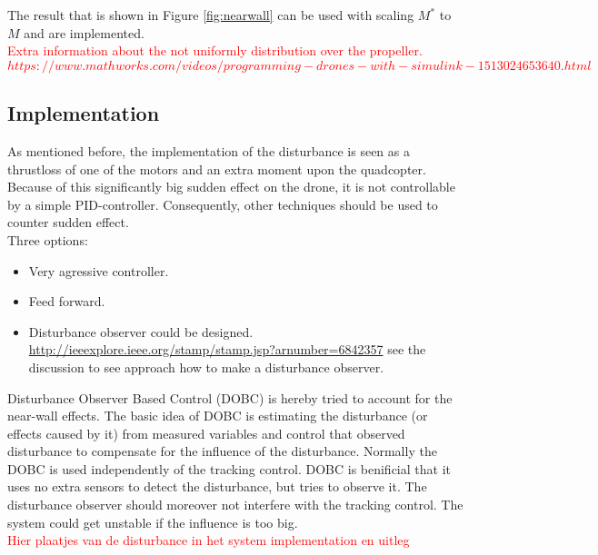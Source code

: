 The result that is shown in Figure \ref{fig:nearwall} can be used with scaling $M^{*}$ to $M$ and are implemented.\\
\textcolor{red}{Extra information about the not uniformly distribution over the propeller. $https://www.mathworks.com/videos/programming-drones-with-simulink-1513024653640.html$}

\subsection{Implementation} \label{Ch:33}
As mentioned before, the implementation of the disturbance is seen as a thrustloss of one of the motors and an extra moment upon the quadcopter. Because of this significantly big sudden effect on the drone, it is not controllable by a simple PID-controller. Consequently, other techniques should be used to counter sudden effect.\\

Three options:
\begin{itemize}
\item Very agressive controller.\\
\item Feed forward. \\
\item Disturbance observer could be designed.\\
\url{http://ieeexplore.ieee.org/stamp/stamp.jsp?arnumber=6842357} see the discussion to see approach how to make a disturbance observer.\\
\end{itemize}

Disturbance Observer Based Control (DOBC) is hereby tried to account for the near-wall effects. The basic idea of DOBC is estimating the disturbance (or effects caused by it) from measured variables and control that observed disturbance to compensate for the influence of the disturbance. Normally the DOBC is used independently of the tracking control. DOBC is benificial that it uses no extra sensors to detect the disturbance, but tries to observe it. The disturbance observer should moreover not interfere with the tracking control. The system could get unstable if the influence is too big.\\



\textcolor{red}{Hier plaatjes van de disturbance in het system implementation en uitleg}\\ 